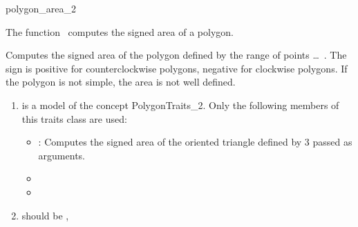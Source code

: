 

\begin{ccRefFunction}{polygon_area_2}  %


\ccDefinition
  
The function \ccRefName\ computes the signed area of a polygon.


{
Computes the signed area of the polygon defined by the range of points
 \ldots\ .
The sign is positive for counterclockwise polygons, negative for
clockwise polygons. If the polygon is not simple, the area is not well defined.
}

\begin{enumerate}
    \item {} is a model of the concept 
	  PolygonTraits\_2.
	  Only the following members of this traits class are used:
          \begin{itemize}
	    \item {} : Computes the signed area of the
	    oriented triangle defined by 3  passed as arguments.
            \item {}
            \item {}
          \end{itemize}
    \item {} should be ,
\end{enumerate}

\ccSeeAlso

 \\
 \\
 \\


\end{ccRefFunction}



